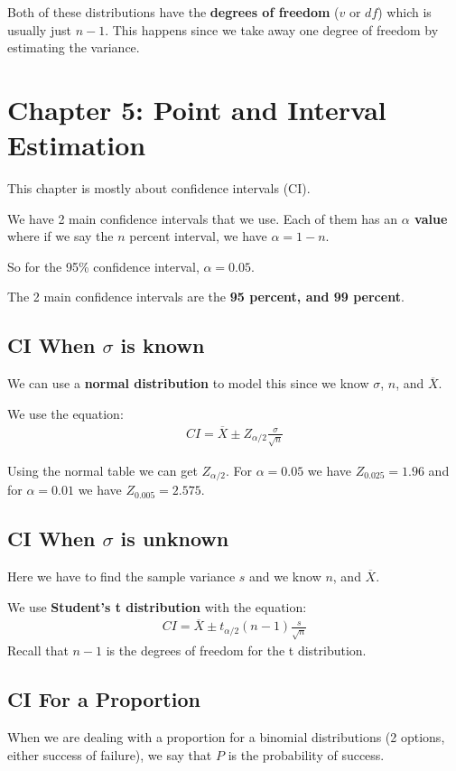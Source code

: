\documentclass[12pt,letterpaper]{article} \usepackage{amsmath} \usepackage{graphicx} \usepackage[margin=1in]{geometry} \usepackage{longtable}  \usepackage{amssymb}
\begin{document}
	Both of these distributions have the \textbf{degrees of freedom} ($v$ or $df$) which is usually just $n-1$. This happens since we take away one degree of freedom by estimating the variance. 
	
	\section{Chapter 5: Point and Interval Estimation} 
	This chapter is mostly about confidence intervals (CI). 
	
	We have 2 main confidence intervals that we use. Each of them has an \textbf{$\alpha$ value} where if we say the $n$ percent interval, we have $\alpha = 1-n$.
	
	So for the 95\% confidence interval, $\alpha = 0.05$. 
	
	The 2 main confidence intervals are the \textbf{95 percent, and 99 percent}. 
	
	\subsection{CI When $\sigma$ is known}
	We can use a \textbf{normal distribution} to model this since we know $\sigma$, $n$, and $\overline X$. 
	
	We use the equation:
	\begin{align*}
		CI = \overline X \pm Z_{\alpha/2} \frac{\sigma}{\sqrt n}
	\end{align*}

	Using the normal table we can get $Z_{\alpha/2}$. For $\alpha = 0.05$ we have $Z_{0.025} = 1.96$ and for $\alpha = 0.01$ we have $Z_{0.005} = 2.575$.
	
	\subsection{CI When $\sigma$ is unknown}
	Here we have to find the sample variance $s$ and we know $n$, and $\overline X$.
	
	We use \textbf{Student's t distribution} with the equation:
	\begin{align*}
		CI = \overline X \pm t_{\alpha/2}(n-1) \frac{s}{\sqrt n}
	\end{align*}
	Recall that $n-1$ is the degrees of freedom for the t distribution.
	
	\subsection{CI For a Proportion}
	When we are dealing with a proportion for a binomial distributions (2 options, either success of failure), we say that $P$ is the probability of success. 
	
\end{document}
